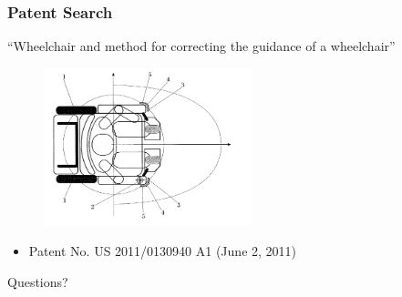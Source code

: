 \documentclass{beamer}
\begin{document}
\begin{frame}
  \frametitle{Patent Search}
  ``Wheelchair and method for correcting the guidance of a wheelchair''
  \begin{figure}
    \centering
    \includegraphics[width=6cm]{patents3.png}
  \end{figure}
  \begin{itemize}
    \item Patent No. US 2011/0130940 A1 (June 2, 2011) \\
  \end{itemize}
\end{frame}

\begin{frame}
  \begin{center}
    \Huge{Questions?}
  \end{center}
\end{frame}
\end{document}
